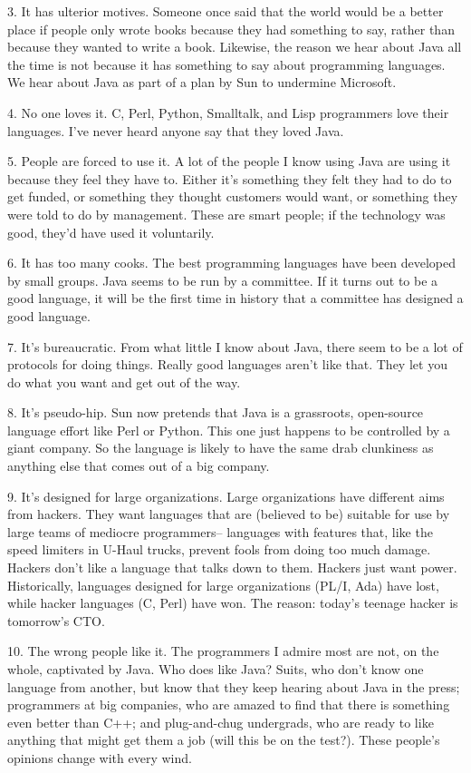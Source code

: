 3. It has ulterior motives. Someone once said that the world would be a
better place if people only wrote books because they had something to
say, rather than because they wanted to write a book. Likewise, the
reason we hear about Java all the time is not because it has something
to say about programming languages. We hear about Java as part of a plan
by Sun to undermine Microsoft.

4. No one loves it. C, Perl, Python, Smalltalk, and Lisp programmers
love their languages. I've never heard anyone say that they loved Java.

5. People are forced to use it. A lot of the people I know using Java
are using it because they feel they have to. Either it's something they
felt they had to do to get funded, or something they thought customers
would want, or something they were told to do by management. These are
smart people; if the technology was good, they'd have used it
voluntarily.

6. It has too many cooks. The best programming languages have been
developed by small groups. Java seems to be run by a committee. If it
turns out to be a good language, it will be the first time in history
that a committee has designed a good language.

7. It's bureaucratic. From what little I know about Java, there seem to
be a lot of protocols for doing things. Really good languages aren't
like that. They let you do what you want and get out of the way.

8. It's pseudo-hip. Sun now pretends that Java is a grassroots,
open-source language effort like Perl or Python. This one just happens
to be controlled by a giant company. So the language is likely to have
the same drab clunkiness as anything else that comes out of a big
company.

9. It's designed for large organizations. Large organizations have
different aims from hackers. They want languages that are (believed to
be) suitable for use by large teams of mediocre programmers-- languages
with features that, like the speed limiters in U-Haul trucks, prevent
fools from doing too much damage. Hackers don't like a language that
talks down to them. Hackers just want power. Historically, languages
designed for large organizations (PL/I, Ada) have lost, while hacker
languages (C, Perl) have won. The reason: today's teenage hacker is
tomorrow's CTO.

10. The wrong people like it. The programmers I admire most are not, on
the whole, captivated by Java. Who does like Java? Suits, who don't know
one language from another, but know that they keep hearing about Java in
the press; programmers at big companies, who are amazed to find that
there is something even better than C++; and plug-and-chug undergrads,
who are ready to like anything that might get them a job (will this be
on the test?). These people's opinions change with every wind.

